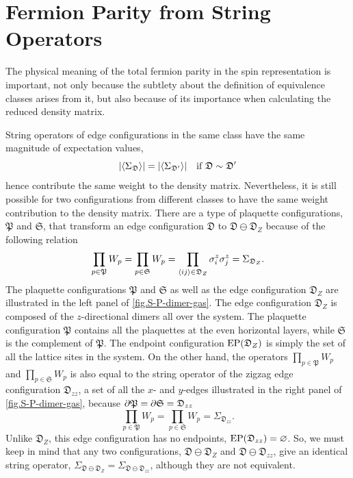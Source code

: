 \section{Fermion Parity from String Operators}\label{sec:fermion_parity_from_string_operators}

The physical meaning of the total fermion parity in the spin representation is important, not only because the subtlety about the definition of equivalence classes arises from it, but also because of its importance when calculating the reduced density matrix.

String operators of edge configurations in the same class have the same magnitude of expectation values,
\[
\abs{\left\langle \Sigma_{\mathfrak{D}} \right\rangle} = \abs{\left\langle \Sigma_{\mathfrak{D}'} \right\rangle} \quad\text{if $\mathfrak{D}\sim\mathfrak{D}'$}
\]
hence contribute the same weight to the density matrix. Nevertheless, it is still possible for two configurations from different classes to have the same weight contribution to the density matrix. There are a type of plaquette configurations, $\mathfrak{P}$ and $\mathfrak{S}$, that transform an edge configuration $\mathfrak{D}$ to $\mathfrak{D}\ominus\mathfrak{D}_Z$ because of the following relation
\begin{equation}\label{equ.P-S-dimer}
    \prod_{p\in\mathfrak{P}}W_p = \prod_{p\in\mathfrak{S}}W_p = \prod_{\left\langle ij \right\rangle\in \mathfrak{D}_Z}\sigma_i^z\sigma_{j}^z = \Sigma_{\mathfrak{D}_Z}.
\end{equation}
The plaquette configurations $\mathfrak{P}$ and $\mathfrak{S}$ as well as the edge configuration $\mathfrak{D}_Z$ are illustrated in the left panel of \autoref{fig.S-P-dimer-gas}. The edge configuration $\mathfrak{D}_Z$ is composed of the $z$-directional dimers all over the system. The plaquette configuration $\mathfrak{P}$ contains all the plaquettes at the even horizontal layers, while $\mathfrak{S}$ is the complement of $\mathfrak{P}$. The endpoint configuration $\mathrm{EP}(\mathfrak{D}_Z)$ is simply the set of all the lattice sites in the system. On the other hand, the operators $\prod_{p\in\mathfrak{P}}W_p$ and $\prod_{p\in \mathfrak{S}}W_p$ is also equal to the string operator of the zigzag edge configuration $\mathfrak{D}_{zz}$, a set of all the $x$- and $y$-edges illustrated in the right panel of \autoref{fig.S-P-dimer-gas}, because $\partial\mathfrak{P} = \partial\mathfrak{S} = \mathfrak{D}_{zz}$
\begin{equation}\label{equ.M-MZ-complement}
\prod_{p\in\mathfrak{P}}W_p = \prod_{p\in\mathfrak{S}}W_p  = \Sigma_{\mathfrak{D}_{zz}}.
\end{equation}
Unlike $\mathfrak{D}_Z$, this edge configuration has no endpoints, $\mathrm{EP}(\mathfrak{D}_{zz})=\varnothing$. So, we must keep in mind that any two configurations, $\mathfrak{D}\ominus\mathfrak{D}_Z$ and $\mathfrak{D}\ominus\mathfrak{D}_{zz}$, give an identical string operator, $\Sigma_{\mathfrak{D}\ominus\mathfrak{D}_Z} = \Sigma_{\mathfrak{D}\ominus\mathfrak{D}_{zz}}$, although they are not equivalent.

